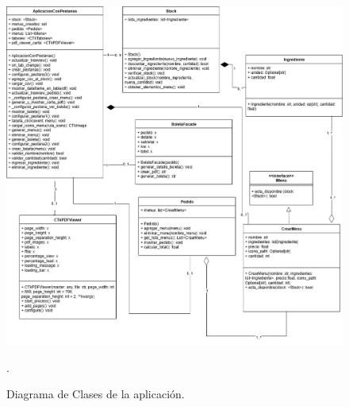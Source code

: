 \documentclass[a4paper,12pt]{article}
\begin{document}
\begin{figure}[H]
    \centering
    \includegraphics[width=1.1\textwidth]{Diagrama-Restaurante.drawio.png}
    \caption{Diagrama de Clases de la aplicación.}.
\end{figure}
\end{document}

